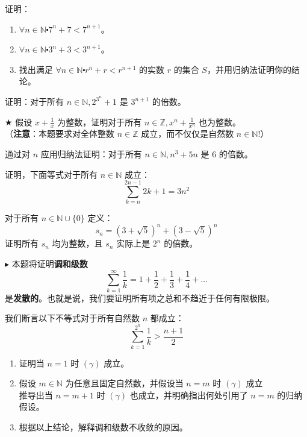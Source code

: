 \begin{exercise}
    证明：
    \begin{enumerate}[label=(\alph*)]
        \item $\forall n \in \mathbb{N} \centerdot 7^n+7 < 7^{n+1}$。
        \item $\forall n \in \mathbb{N} \centerdot 3^n+3 < 3^{n+1}$。
        \item 找出满足 $\forall n \in \mathbb{N} \centerdot r^n+r < r^{n+1}$ 的实数 $r$ 的集合 $S$，并用归纳法证明你的结论。
    \end{enumerate}
\end{exercise}

\begin{exercise}
    证明：对于所有 $n \in \mathbb{N}, 2^{3^n}+1$ 是 $3^{n+1}$ 的倍数。
\end{exercise}

\begin{exercise}
    $\bigstar$ 假设 $x + \frac{1}{x}$ 为整数，证明对于所有 $n \in \mathbb{Z}, x^n + \frac{1}{x^n}$ 也为整数。\\
    （\textbf{注意}：本题要求对全体整数 $n \in \mathbb{Z}$ 成立，而不仅仅是自然数 $n \in \mathbb{N}$!）
\end{exercise}

\begin{exercise}
    通过对 $n$ 应用归纳法证明：对于所有 $n \in \mathbb{N}, n^3+5n$ 是 $6$ 的倍数。
\end{exercise}

\begin{exercise}
    证明，下面等式对于所有 $n \in \mathbb{N}$ 成立：
    \[\sum_{k=n}^{2n-1} 2k+1=3n^2\]
\end{exercise}

\begin{exercise}
    对于所有 $n \in \mathbb{N} \cup \{0\}$ 定义：
    \[s_n=(3+\sqrt{5})^n+(3-\sqrt{5})^n\]
    证明所有 $s_n$ 均为整数，且 $s_n$ 实际上是 $2^n$ 的倍数。
\end{exercise}

\begin{exercise}
    $\blacktriangleright$ 本题将证明\textbf{调和级数}
    \[\sum_{k=1}^{\infty} \frac{1}{k} = 1+\frac{1}{2}+\frac{1}{3}+\frac{1}{4}+\dots\]
    是\textbf{发散的}。也就是说，我们要证明所有项之总和不趋近于任何有限极限。

    我们断言以下不等式对于所有自然数 $n$ 都成立：
    \[\sum_{k=1}^{2^n} \frac{1}{k} > \frac{n+1}{2} \tag{$\gamma$}\]
    \begin{enumerate}[label=(\alph*)]
        \item 证明当 $n=1$ 时 $(\gamma)$ 成立。
        \item 假设 $m \in \mathbb{N}$ 为任意且固定自然数，并假设当 $n=m$ 时 $(\gamma)$ 成立 \\
            推导出当 $n=m+1$ 时 $(\gamma)$ 也成立，并明确指出何处引用了 $n=m$ 的归纳假设。
        \item 根据以上结论，解释调和级数不收敛的原因。
    \end{enumerate}
\end{exercise}

